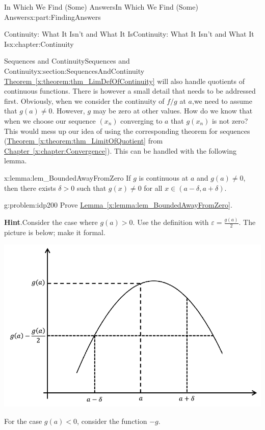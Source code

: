 \documentclass[oneside,10pt,]{book}
\newcommand{\blocktitlefont}{\relax}
\newcommand{\xreffont}{\relax}
\numberwithin{equation}{section}
\newcommand{\eps}{\varepsilon}
\newcommand{\lt}{<}
\begin{document}
\begin{partptx}{In Which We Find (Some) Answers}{}{In Which We Find (Some) Answers}{}{}{x:part:FindingAnswers}
\begin{chapterptx}{Continuity: What It Isn't and What It Is}{}{Continuity: What It Isn't and What It Is}{}{}{x:chapter:Continuity}
\begin{sectionptx}{Sequences and Continuity}{}{Sequences and Continuity}{}{}{x:section:SequencesAndContinuity}
\hyperref[x:theorem:thm_LimDefOfContinuity]{Theorem~{\xreffont\ref{x:theorem:thm_LimDefOfContinuity}}} will also handle quotients of continuous functions. There is however a small detail that needs to be addressed first. Obviously, when we consider the continuity of \(f/g\) at \(a\),\(\)we need to assume that \(g(a)\neq 0\). However, \(g\) may be zero at other values. How do we know that when we choose our sequence \(\left(x_n\right)\) converging to \(a\) that \(g(x_n)\) is not zero? This would mess up our idea of using the corresponding theorem for sequences (\hyperref[x:theorem:thm_LimitOfQuotient]{Theorem~{\xreffont\ref{x:theorem:thm_LimitOfQuotient}}} from \hyperref[x:chapter:Convergence]{Chapter~{\xreffont\ref{x:chapter:Convergence}}}). This can be handled with the following lemma.%
\begin{lemma}{}{}{x:lemma:lem_BoundedAwayFromZero}%
If \(g\) is continuous at \(a\) and \(g(a)\neq 0\), then there exists \(\delta>0\) such that \(g(x)\neq 0\) for all \(x\in(a-\delta,a+\delta)\).%
\end{lemma}
\begin{problem}{}{g:problem:idp200}%
Prove \hyperref[x:lemma:lem_BoundedAwayFromZero]{Lemma~{\xreffont\ref{x:lemma:lem_BoundedAwayFromZero}}}.%
\par\smallskip%
\noindent\textbf{\blocktitlefont Hint}.\hypertarget{g:hint:idp201}{}\quad{}Consider the case where \(g(a)>0\). Use the definition with \(\eps=\frac{g(a)}{2}\). The picture is below; make it formal.%
\begin{image}{0.125}{0.75}{0.125}%
\includegraphics[width=\linewidth]{images/Ch5fig8.png}
\end{image}%
For the case \(g(a)\lt 0\), consider the function \(-g\).%
\end{problem}

\end{sectionptx}
\end{chapterptx}
\end{partptx}
\end{document}
